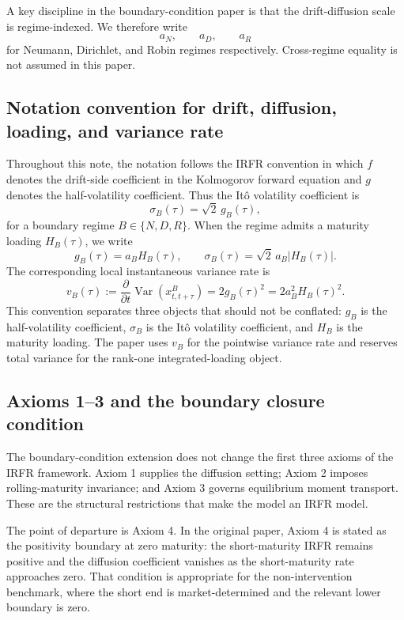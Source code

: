 \documentclass[11pt]{article}
\newcommand{\Var}{\operatorname{Var}}
\numberwithin{equation}{section}
\begin{document}
A key discipline in the boundary-condition paper is that the drift-diffusion scale is regime-indexed. We therefore write
\begin{equation}
a_N,\qquad a_D,\qquad a_R
\end{equation}
for Neumann, Dirichlet, and Robin regimes respectively. Cross-regime equality is not assumed in this paper.


\subsection{Notation convention for drift, diffusion, loading, and variance rate}

Throughout this note, the notation follows the IRFR convention in which $f$ denotes the drift-side coefficient in the Kolmogorov forward equation and $g$ denotes the half-volatility coefficient. Thus the It\^o volatility coefficient is
\begin{equation}
\sigma_B(\tau)=\sqrt{2}\,g_B(\tau),
\end{equation}
for a boundary regime $B\in\{N,D,R\}$. When the regime admits a maturity loading $H_B(\tau)$, we write
\begin{equation}
g_B(\tau)=a_BH_B(\tau),
\qquad
\sigma_B(\tau)=\sqrt{2}\,a_B|H_B(\tau)|.
\end{equation}
The corresponding local instantaneous variance rate is
\begin{equation}
v_B(\tau)
:=\frac{\partial}{\partial t}\Var(x^B_{t,t+\tau})
=2g_B(\tau)^2
=2a_B^2H_B(\tau)^2.
\end{equation}
This convention separates three objects that should not be conflated: $g_B$ is the half-volatility coefficient, $\sigma_B$ is the It\^o volatility coefficient, and $H_B$ is the maturity loading. The paper uses $v_B$ for the pointwise variance rate and reserves total variance for the rank-one integrated-loading object.

\subsection{Axioms 1--3 and the boundary closure condition}

The boundary-condition extension does not change the first three axioms of the IRFR framework. Axiom 1 supplies the diffusion setting; Axiom 2 imposes rolling-maturity invariance; and Axiom 3 governs equilibrium moment transport. These are the structural restrictions that make the model an IRFR model.

The point of departure is Axiom 4. In the original paper, Axiom 4 is stated as the positivity boundary at zero maturity: the short-maturity IRFR remains positive and the diffusion coefficient vanishes as the short-maturity rate approaches zero. That condition is appropriate for the non-intervention benchmark, where the short end is market-determined and the relevant lower boundary is zero.
\end{document}

